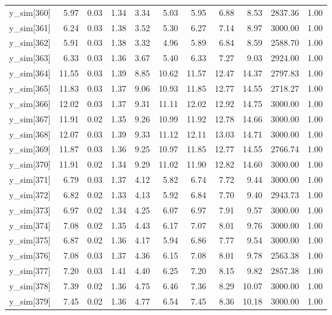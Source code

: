 \begin{table}[ht]
\begin{tabular}{rrrrrrrrrrr}
  y\_sim[360] & 5.97 & 0.03 & 1.34 & 3.34 & 5.03 & 5.95 & 6.88 & 8.53 & 2837.36 & 1.00 \\ 
  y\_sim[361] & 6.24 & 0.03 & 1.38 & 3.52 & 5.30 & 6.27 & 7.14 & 8.97 & 3000.00 & 1.00 \\ 
  y\_sim[362] & 5.91 & 0.03 & 1.38 & 3.32 & 4.96 & 5.89 & 6.84 & 8.59 & 2588.70 & 1.00 \\ 
  y\_sim[363] & 6.33 & 0.03 & 1.36 & 3.67 & 5.40 & 6.33 & 7.27 & 9.03 & 2924.00 & 1.00 \\ 
  y\_sim[364] & 11.55 & 0.03 & 1.39 & 8.85 & 10.62 & 11.57 & 12.47 & 14.37 & 2797.83 & 1.00 \\ 
  y\_sim[365] & 11.83 & 0.03 & 1.37 & 9.06 & 10.93 & 11.85 & 12.77 & 14.55 & 2718.27 & 1.00 \\ 
  y\_sim[366] & 12.02 & 0.03 & 1.37 & 9.31 & 11.11 & 12.02 & 12.92 & 14.75 & 3000.00 & 1.00 \\ 
  y\_sim[367] & 11.91 & 0.02 & 1.35 & 9.26 & 10.99 & 11.92 & 12.78 & 14.66 & 3000.00 & 1.00 \\ 
  y\_sim[368] & 12.07 & 0.03 & 1.39 & 9.33 & 11.12 & 12.11 & 13.03 & 14.71 & 3000.00 & 1.00 \\ 
  y\_sim[369] & 11.87 & 0.03 & 1.36 & 9.25 & 10.97 & 11.85 & 12.77 & 14.55 & 2766.74 & 1.00 \\ 
  y\_sim[370] & 11.91 & 0.02 & 1.34 & 9.29 & 11.02 & 11.90 & 12.82 & 14.60 & 3000.00 & 1.00 \\ 
  y\_sim[371] & 6.79 & 0.03 & 1.37 & 4.12 & 5.82 & 6.74 & 7.72 & 9.44 & 3000.00 & 1.00 \\ 
  y\_sim[372] & 6.82 & 0.02 & 1.33 & 4.13 & 5.92 & 6.84 & 7.70 & 9.40 & 2943.73 & 1.00 \\ 
  y\_sim[373] & 6.97 & 0.02 & 1.34 & 4.25 & 6.07 & 6.97 & 7.91 & 9.57 & 3000.00 & 1.00 \\ 
  y\_sim[374] & 7.08 & 0.02 & 1.35 & 4.43 & 6.17 & 7.07 & 8.01 & 9.76 & 3000.00 & 1.00 \\ 
  y\_sim[375] & 6.87 & 0.02 & 1.36 & 4.17 & 5.94 & 6.86 & 7.77 & 9.54 & 3000.00 & 1.00 \\ 
  y\_sim[376] & 7.08 & 0.03 & 1.37 & 4.36 & 6.15 & 7.08 & 8.01 & 9.78 & 2563.38 & 1.00 \\ 
  y\_sim[377] & 7.20 & 0.03 & 1.41 & 4.40 & 6.25 & 7.20 & 8.15 & 9.82 & 2857.38 & 1.00 \\ 
  y\_sim[378] & 7.39 & 0.02 & 1.36 & 4.75 & 6.46 & 7.36 & 8.29 & 10.07 & 3000.00 & 1.00 \\ 
  y\_sim[379] & 7.45 & 0.02 & 1.36 & 4.77 & 6.54 & 7.45 & 8.36 & 10.18 & 3000.00 & 1.00 \\ 

\end{tabular}
\end{table}
